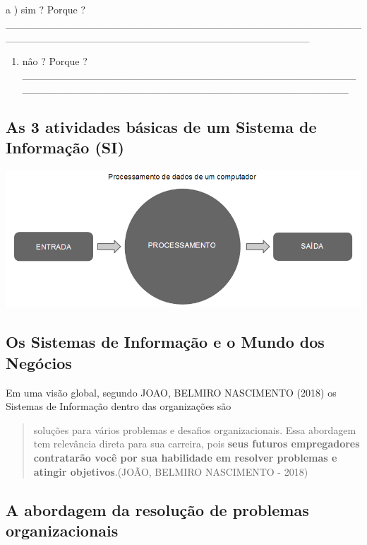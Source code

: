 \documentclass[
]{book}
\providecommand{\tightlist}{%
  \setlength{\itemsep}{0pt}\setlength{\parskip}{0pt}}
\begin{document}
a ) sim ? Porque ?\_\_\_\_\_\_\_\_\_\_\_\_\_\_\_\_\_\_\_\_\_\_\_\_\_\_\_\_\_\_\_\_\_\_\_\_\_\_\_\_\_\_\_\_\_\_\_\_\_\_\_\_\_\_\_\_\_\_\_\_\_\_\_\_\_\_\_\_\_\_\_\_\_\_\_\_\_\_\_\_\_\_\_\_\_\_\_\_\_

\begin{enumerate}
\def\labelenumi{\alph{enumi})}
\setcounter{enumi}{1}
\tightlist
\item
  nâo ? Porque ?\_\_\_\_\_\_\_\_\_\_\_\_\_\_\_\_\_\_\_\_\_\_\_\_\_\_\_\_\_\_\_\_\_\_\_\_\_\_\_\_\_\_\_\_\_\_\_\_\_\_\_\_\_\_\_\_\_\_\_\_\_\_\_\_\_\_\_\_\_\_\_\_\_\_\_\_\_\_\_\_\_\_\_\_\_\_\_\_\_
\end{enumerate}

\subsection{As 3 atividades básicas de um Sistema de Informação (SI)}\label{as-3-atividades-buxe1sicas-de-um-sistema-de-informauxe7uxe3o-si}

\includegraphics{images/processamento-dados-computador.png}

\subsection{Os Sistemas de Informação e o Mundo dos Negócios}\label{os-sistemas-de-informauxe7uxe3o-e-o-mundo-dos-neguxf3cios}

Em uma visão global, segundo JOAO, BELMIRO NASCIMENTO (2018) os Sistemas de Informação dentro das organizações são

\begin{quote}
soluções para vários problemas e desafios organizacionais. Essa abordagem tem relevância direta para sua carreira, pois \textbf{seus futu­ros empregadores contratarão você por sua habilidade em resolver problemas e atingir objetivos}.(JOÃO, BELMIRO NASCIMENTO - 2018)
\end{quote}

\subsection{A abordagem da resolução de problemas organizacionais}\label{a-abordagem-da-resoluuxe7uxe3o-de-problemas-organizacionais}
\end{document}
